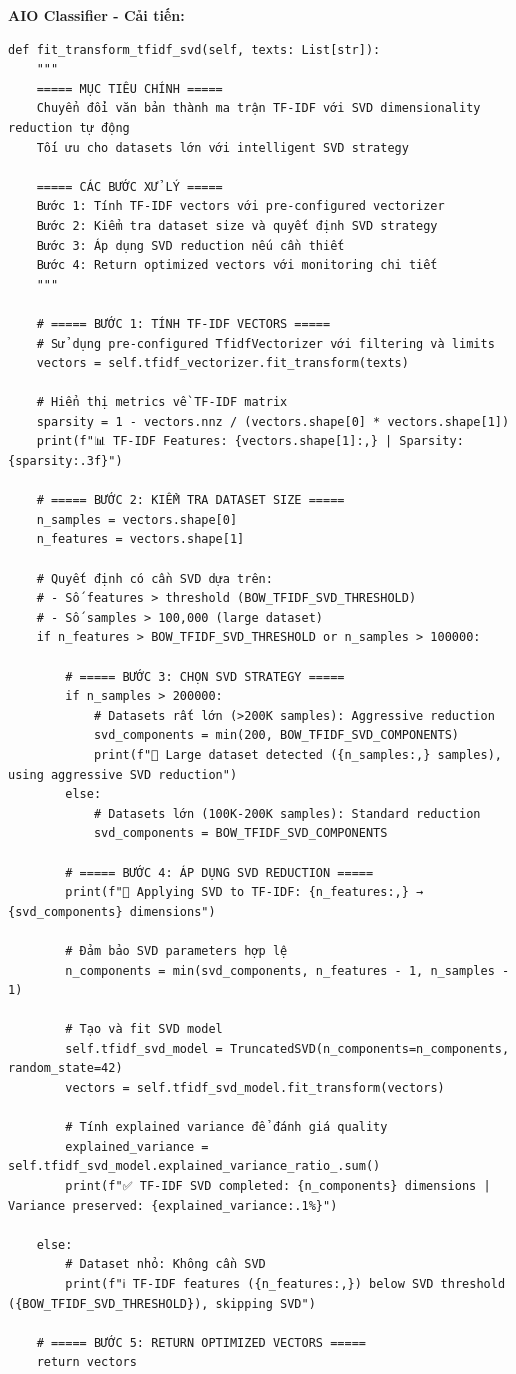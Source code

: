 \textbf{AIO Classifier - Cải tiến:}
\begin{verbatim}
def fit_transform_tfidf_svd(self, texts: List[str]):
    """
    ===== MỤC TIÊU CHÍNH =====
    Chuyển đổi văn bản thành ma trận TF-IDF với SVD dimensionality reduction tự động
    Tối ưu cho datasets lớn với intelligent SVD strategy
    
    ===== CÁC BƯỚC XỬ LÝ =====
    Bước 1: Tính TF-IDF vectors với pre-configured vectorizer
    Bước 2: Kiểm tra dataset size và quyết định SVD strategy
    Bước 3: Áp dụng SVD reduction nếu cần thiết
    Bước 4: Return optimized vectors với monitoring chi tiết
    """
    
    # ===== BƯỚC 1: TÍNH TF-IDF VECTORS =====
    # Sử dụng pre-configured TfidfVectorizer với filtering và limits
    vectors = self.tfidf_vectorizer.fit_transform(texts)
    
    # Hiển thị metrics về TF-IDF matrix
    sparsity = 1 - vectors.nnz / (vectors.shape[0] * vectors.shape[1])
    print(f"📊 TF-IDF Features: {vectors.shape[1]:,} | Sparsity: {sparsity:.3f}")
    
    # ===== BƯỚC 2: KIỂM TRA DATASET SIZE =====
    n_samples = vectors.shape[0]
    n_features = vectors.shape[1]
    
    # Quyết định có cần SVD dựa trên:
    # - Số features > threshold (BOW_TFIDF_SVD_THRESHOLD)
    # - Số samples > 100,000 (large dataset)
    if n_features > BOW_TFIDF_SVD_THRESHOLD or n_samples > 100000:
        
        # ===== BƯỚC 3: CHỌN SVD STRATEGY =====
        if n_samples > 200000:
            # Datasets rất lớn (>200K samples): Aggressive reduction
            svd_components = min(200, BOW_TFIDF_SVD_COMPONENTS)
            print(f"🔧 Large dataset detected ({n_samples:,} samples), using aggressive SVD reduction")
        else:
            # Datasets lớn (100K-200K samples): Standard reduction
            svd_components = BOW_TFIDF_SVD_COMPONENTS
        
        # ===== BƯỚC 4: ÁP DỤNG SVD REDUCTION =====
        print(f"🔧 Applying SVD to TF-IDF: {n_features:,} → {svd_components} dimensions")
        
        # Đảm bảo SVD parameters hợp lệ
        n_components = min(svd_components, n_features - 1, n_samples - 1)
        
        # Tạo và fit SVD model
        self.tfidf_svd_model = TruncatedSVD(n_components=n_components, random_state=42)
        vectors = self.tfidf_svd_model.fit_transform(vectors)
        
        # Tính explained variance để đánh giá quality
        explained_variance = self.tfidf_svd_model.explained_variance_ratio_.sum()
        print(f"✅ TF-IDF SVD completed: {n_components} dimensions | Variance preserved: {explained_variance:.1%}")
        
    else:
        # Dataset nhỏ: Không cần SVD
        print(f"ℹ️ TF-IDF features ({n_features:,}) below SVD threshold ({BOW_TFIDF_SVD_THRESHOLD}), skipping SVD")
    
    # ===== BƯỚC 5: RETURN OPTIMIZED VECTORS =====
    return vectors
\end{verbatim}

